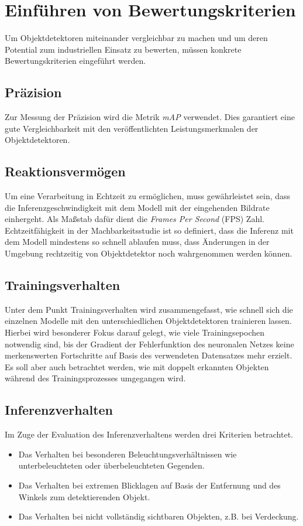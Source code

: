 \section{Einführen von Bewertungskriterien}

Um Objektdetektoren miteinander vergleichbar zu machen und um deren Potential zum industriellen Einsatz zu bewerten, müssen konkrete Bewertungskriterien eingeführt werden.

\subsection*{Präzision}

Zur Messung der Präzision wird die Metrik \textit{mAP} verwendet. Dies garantiert eine gute Vergleichbarkeit mit den veröffentlichten Leistungsmerkmalen der Objektdetektoren.

\subsection*{Reaktionsvermögen}

Um eine Verarbeitung in Echtzeit zu ermöglichen, muss gewährleistet sein, dass die Inferenzgeschwindigkeit mit dem Modell mit der eingehenden Bildrate einhergeht. Als Maßstab dafür dient die \textit{Frames Per Second} (FPS) Zahl. Echtzeitfähigkeit in der Machbarkeitsstudie ist so definiert, dass die Inferenz mit dem Modell mindestens so schnell ablaufen muss, dass Änderungen in der Umgebung rechtzeitig von Objektdetektor noch wahrgenommen werden können. 

\subsection*{Trainingsverhalten}

Unter dem Punkt Trainingsverhalten wird zusammengefasst, wie schnell sich die einzelnen Modelle mit den unterschiedlichen Objektdetektoren trainieren lassen. Hierbei wird besonderer Fokus darauf gelegt, wie viele Trainingsepochen notwendig sind, bis der Gradient der Fehlerfunktion des neuronalen Netzes keine merkenswerten Fortschritte auf Basis des verwendeten Datensatzes mehr erzielt. Es soll aber auch betrachtet werden, wie mit doppelt erkannten Objekten während des Trainingsprozesses umgegangen wird. 

\subsection*{Inferenzverhalten}

Im Zuge der Evaluation des Inferenzverhaltens werden drei Kriterien betrachtet. 

\begin{itemize}
	\item Das Verhalten bei besonderen Beleuchtungsverhältnissen wie unterbeleuchteten oder überbeleuchteten Gegenden.
	\item Das Verhalten bei extremen Blicklagen auf Basis der Entfernung und des Winkels zum detektierenden Objekt.
	\item Das Verhalten bei nicht vollständig sichtbaren Objekten, z.B. bei Verdeckung.
\end{itemize}
